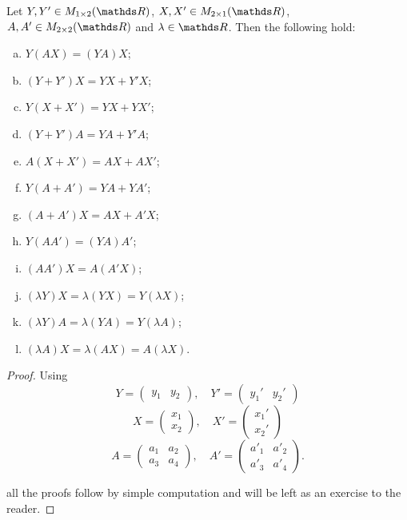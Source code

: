 \begin{lemma}
	Let $Y,Y'\in M_{1\times 2}(\R)$, $X,X'\in M_{2\times 1}(\R)$, $A,A'\in M_{2\times 2}(\R)$ and $\lambda \in \R$. Then the following hold:
	\begin{multicols}{2}
		\begin{enumerate}[a)]
			\item $Y(AX)=(YA)X$;
			\item $(Y+Y')X=YX+Y'X$;
			\item $Y(X+X')=YX+YX'$;
			\item $(Y+Y')A=YA+Y'A$;
			\item $A(X+X')=AX+AX'$;
			\item $Y(A+A')=YA+YA'$;
			\item $(A+A')X=AX+A'X$;
			\item $Y(AA')=(YA)A'$;
			\item $(AA')X=A(A'X)$;
			\item $(\lambda Y)X=\lambda (YX)=Y(\lambda X)$;
			\item $(\lambda Y)A=\lambda (YA)=Y(\lambda A)$;
			\item $(\lambda A)X=\lambda(AX)=A(\lambda X)$.
		\end{enumerate}
	\end{multicols}
\end{lemma}
\begin{proof}
	Using
	\[Y=\begin{pmatrix}
	y_1&y_2
	\end{pmatrix},\quad Y'=\begin{pmatrix}
	y_1'&y_2'
	\end{pmatrix}\]
	\[X=\begin{pmatrix}
	x_1\\x_2
	\end{pmatrix},\quad X'=\begin{pmatrix}
	x_1'\\x_2'
	\end{pmatrix}\]
	\[A=\begin{pmatrix}
	a_1&a_2\\a_3&a_4
	\end{pmatrix},\quad A'=\begin{pmatrix}
	a'_1&a'_2\\a'_3&a'_4
	\end{pmatrix}.\]
	
	all the proofs follow by simple computation and will be left as an exercise to the reader.
\end{proof}

